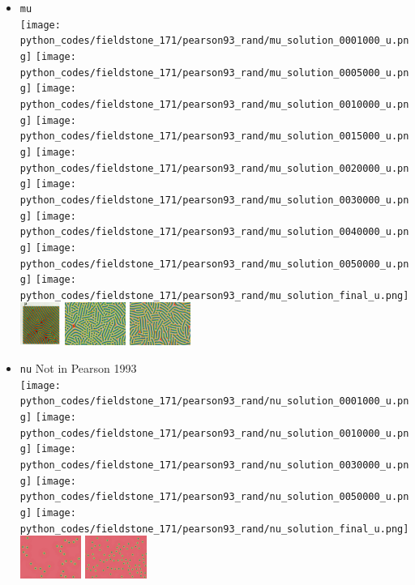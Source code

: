 \begin{itemize}
\item {\tt mu}\\
\texttt{[image: python\_codes/fieldstone\_171/pearson93\_rand/mu\_solution\_0001000\_u.png]}
\texttt{[image: python\_codes/fieldstone\_171/pearson93\_rand/mu\_solution\_0005000\_u.png]}
\texttt{[image: python\_codes/fieldstone\_171/pearson93\_rand/mu\_solution\_0010000\_u.png]}
\texttt{[image: python\_codes/fieldstone\_171/pearson93\_rand/mu\_solution\_0015000\_u.png]}
\texttt{[image: python\_codes/fieldstone\_171/pearson93\_rand/mu\_solution\_0020000\_u.png]}
\texttt{[image: python\_codes/fieldstone\_171/pearson93\_rand/mu\_solution\_0030000\_u.png]}
\texttt{[image: python\_codes/fieldstone\_171/pearson93\_rand/mu\_solution\_0040000\_u.png]}
\texttt{[image: python\_codes/fieldstone\_171/pearson93\_rand/mu\_solution\_0050000\_u.png]}
\texttt{[image: python\_codes/fieldstone\_171/pearson93\_rand/mu\_solution\_final\_u.png]}\\
\includegraphics[height=1.4cm]{python_codes/fieldstone_171/images/pear93_mu}
\includegraphics[height=1.4cm]{python_codes/fieldstone_171/images/munafo_mu1}
\includegraphics[height=1.4cm]{python_codes/fieldstone_171/images/munafo_mu2}



\item {\tt nu} Not in Pearson 1993\\
\texttt{[image: python\_codes/fieldstone\_171/pearson93\_rand/nu\_solution\_0001000\_u.png]}
\texttt{[image: python\_codes/fieldstone\_171/pearson93\_rand/nu\_solution\_0010000\_u.png]}
\texttt{[image: python\_codes/fieldstone\_171/pearson93\_rand/nu\_solution\_0030000\_u.png]}
\texttt{[image: python\_codes/fieldstone\_171/pearson93\_rand/nu\_solution\_0050000\_u.png]}
\texttt{[image: python\_codes/fieldstone\_171/pearson93\_rand/nu\_solution\_final\_u.png]}\\
\includegraphics[height=1.4cm]{python_codes/fieldstone_171/images/munafo_nu1}
\includegraphics[height=1.4cm]{python_codes/fieldstone_171/images/munafo_nu2}


\end{itemize}
